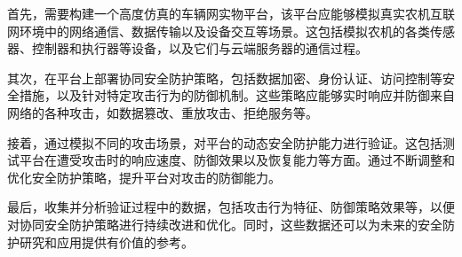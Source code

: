 首先，需要构建一个高度仿真的车辆网实物平台，该平台应能够模拟真实农机互联网环境中的网络通信、数据传输以及设备交互等场景。这包括模拟农机的各类传感器、控制器和执行器等设备，以及它们与云端服务器的通信过程。

其次，在平台上部署协同安全防护策略，包括数据加密、身份认证、访问控制等安全措施，以及针对特定攻击行为的防御机制。这些策略应能够实时响应并防御来自网络的各种攻击，如数据篡改、重放攻击、拒绝服务等。

接着，通过模拟不同的攻击场景，对平台的动态安全防护能力进行验证。这包括测试平台在遭受攻击时的响应速度、防御效果以及恢复能力等方面。通过不断调整和优化安全防护策略，提升平台对攻击的防御能力。

最后，收集并分析验证过程中的数据，包括攻击行为特征、防御策略效果等，以便对协同安全防护策略进行持续改进和优化。同时，这些数据还可以为未来的安全防护研究和应用提供有价值的参考。
